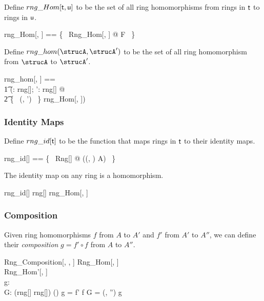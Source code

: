 \documentclass{amsart}
\begin{document}
Define $rng\_Hom[\mathsf{t}, \mathsf{u}]$ to be the set of all ring homomorphisms from rings in $\mathsf{t}$
to rings in $\mathsf{u}$.

\begin{zed}
	rng\_Hom[\genT, \genU] == \{~ Rng\_Hom[\genT, \genU] @ F ~\}
\end{zed}

Define $rng\_hom(\strucA, \strucA')$ to be the set of all ring homomorphism from $\strucA$ to $\strucA'$.

\begin{zed}
	rng\_hom[\genT, \genU] == \\
	\t1	(\lambda \strucA: rng[\genT]; \strucA': rng[\genU] @ \\
	\t2		\{~ (\strucA, \strucA') ~\} \dres rng\_Hom[\genT, \genU])
\end{zed}

\subsubsection{Identity Maps}

Define $rng\_id[\mathsf{t}]$ to be the function that maps rings in $\mathsf{t}$ to their identity maps.

\begin{zed}
	rng\_id[\genT] == \{~ Rng[\genT] @ \strucA \mapsto ((\strucA, \strucA) \mapsto \id A) ~\}
\end{zed}

\begin{remark}
	The identity map on any ring is a homomorphism.
	
\begin{zed}
	rng\_id[\setT] \in rng[\setT] \fun  rng\_Hom[\setT, \setT]
\end{zed}

\end{remark}

\subsubsection{Composition}

Given ring homomorphisms $f$ from $A$ to $A'$ and $f'$ from $A'$ to $A''$,
we can define their \textit{composition} $g = f' \circ f$ from $A$ to $A''$.

\begin{schema}{Rng\_Composition}[\genT, \genU, \genV]
	Rng\_Hom[\genT, \genU] \\
	Rng\_Hom'[\genU, \genV] \\
	g: \genT \pfun \genV \\
	G: (rng[\genT] \cross rng[\genV]) \cross (\genT \pfun \genV)
\where
	g = f' \circ f
\also
	G = (\strucA, \strucA'') \mapsto g
\end{schema}
\end{document}
